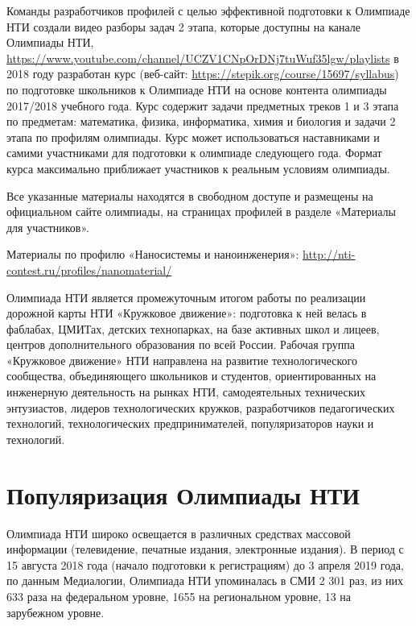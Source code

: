Команды разработчиков профилей с целью эффективной подготовки к Олимпиаде НТИ создали видео разборы задач 2 этапа, которые доступны на канале Олимпиады НТИ, \url{https://www.youtube.com/channel/UCZV1CNpOrDNj7tuWuf35lgw/playlists} в 2018 году разработан курс (веб-сайт: \url{https://stepik.org/course/15697/syllabus}) по подготовке школьников к Олимпиаде НТИ на основе контента олимпиады 2017/2018 учебного года. Курс содержит задачи предметных треков 1 и 3 этапа по предметам: математика, физика, информатика, химия и биология и задачи 2 этапа по профилям олимпиады. Курс может использоваться наставниками и самими участниками для подготовки к олимпиаде следующего года. Формат курса максимально приближает участников к реальным условиям олимпиады.

Все указанные материалы находятся в свободном доступе и размещены на официальном сайте олимпиады, на страницах профилей в разделе «Материалы для участников». 

Материалы по профилю «Наносистемы и наноинженерия»: \url{http://nti-contest.ru/profiles/nanomaterial/}

Олимпиада НТИ является промежуточным итогом работы по реализации дорожной карты НТИ «Кружковое движение»: подготовка к ней велась в фаблабах, ЦМИТах, детских технопарках, на базе активных школ и лицеев, центров дополнительного образования по всей России. Рабочая группа «Кружковое движение» НТИ направлена на развитие технологического сообщества, объединяющего школьников и студентов, ориентированных на инженерную деятельность на рынках НТИ, самодеятельных технических энтузиастов, лидеров технологических кружков, разработчиков педагогических технологий, технологических предпринимателей, популяризаторов науки и технологий.

\section*{Популяризация Олимпиады НТИ}

Олимпиада НТИ широко освещается в различных средствах массовой информации (телевидение, печатные издания, электронные издания). В период с 15 августа 2018 года (начало подготовки к регистрациям) до 3 апреля 2019 года, по данным Медиалогии, Олимпиада НТИ упоминалась в СМИ 2 301 раз, из них 633 раза на федеральном уровне, 1655 на региональном уровне, 13 на зарубежном уровне. 

